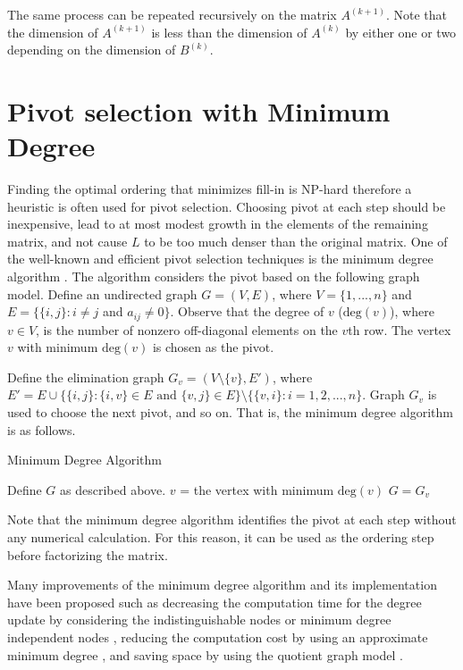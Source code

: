 \documentclass{article}
\begin{document}
The same process can be repeated recursively on the matrix $A^{(k+1)}$. Note that the dimension of  $A^{(k+1)}$ is less than the dimension of $A^{(k)}$ by either one or two depending on the dimension of $B^{(k)}$.




\section{Pivot selection with Minimum Degree} \label{sec3}
Finding the optimal ordering that minimizes fill-in is NP-hard \cite{MFNP} therefore a heuristic is often used for pivot selection. 
Choosing pivot at each step should be inexpensive, lead to at most modest growth in the elements of the remaining matrix, and not cause $L$ to be too much denser than the original matrix.  One of the well-known and efficient pivot selection techniques is the minimum degree algorithm \cite{MD1, MD2, MD3}.
The algorithm considers the pivot based on the following graph model. 
Define an undirected graph $G=(V,E)$, where $V=\{1,...,n\}$ and $E=\{\{i,j\}:i\neq j$ and $a_{ij}\neq 0\}$.
Observe that the degree of $v$ ($\text{deg}(v)$), where $v \in V$, is the number of nonzero off-diagonal elements on the $v$th row.
The vertex $v$ with minimum $\text{deg}(v)$ is chosen as the pivot.

Define the elimination graph $G_v=(V\setminus \{v\},E')$, where $E'=E\cup\{\{i,j\}:\{i,v\}\in E \mbox{ and }\{v,j\}\in E\}\setminus \{\{v,i\}:i=1,2,...,n\}$.
Graph $G_v$ is used to choose the next pivot, and so on.
That is, the minimum degree algorithm is as follows. 

\begin{algorithm}
\caption{Minimum Degree Algorithm}\label{algo1}
\begin{algorithmic}
\STATE Define $G$ as described above.
\STATE  $v$ = the vertex with minimum $\text{deg}(v)$
 \STATE  $G=G_v$
\ENDWHILE
\end{algorithmic}
\end{algorithm}
Note that the minimum degree algorithm identifies the pivot at each step without any numerical calculation.
For this reason, it can be used as the ordering step before factorizing the matrix.


Many improvements of the minimum degree algorithm and its implementation have been proposed \cite{MDevol} such as decreasing the computation time for the degree update by considering the indistinguishable nodes \cite{massEli} or minimum degree independent nodes \cite{MMD1}, reducing the computation cost by using an approximate minimum degree \cite{AMD1}, and saving space by using the quotient graph model \cite{quotGraph}.
\end{document}
